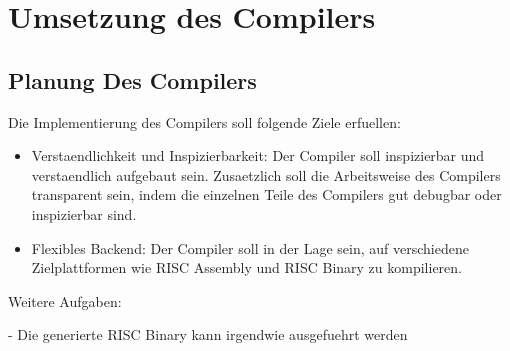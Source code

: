 \part{Umsetzung des Compilers}
\chapter{Planung Des Compilers}


Die Implementierung des Compilers soll folgende Ziele erfuellen:

\begin{itemize}
\item Verstaendlichkeit und Inspizierbarkeit: Der Compiler soll inspizierbar und verstaendlich aufgebaut sein. Zusaetzlich soll die Arbeitsweise des Compilers transparent sein, indem die einzelnen Teile des Compilers gut debugbar oder inspizierbar sind.
\item Flexibles Backend: Der Compiler soll in der Lage sein, auf verschiedene Zielplattformen wie RISC Assembly und RISC Binary zu kompilieren.
\end{itemize}

Weitere Aufgaben:

- Die generierte RISC Binary kann irgendwie ausgefuehrt werden
